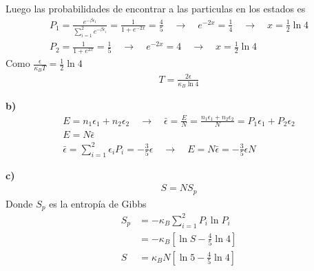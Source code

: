 \documentclass{article}
\begin{document}
Luego las probabilidades de encontrar a las particulas en los estados es 
\begin{gather*}
  P_1 = \frac{e ^ {-\beta \epsilon_1}}{\displaystyle\sum_{i= 1 }^{2 } e ^ {-\beta \epsilon_i }} = \frac{1}{1 + e ^ {- 2x }} = \frac{4}{5} \quad \rightarrow \quad e ^ {-2x } = \frac{1}{4} \quad \rightarrow \quad x = \frac{1}{2} \ln 4 
  \\
  P_2 = \frac{1}{1 + e ^ {2 x }} = \frac{1}{5 } \quad \rightarrow \quad e ^ {-2x } = 4 \quad \rightarrow \quad x = \frac{1}{2} \ln 4
\end{gather*}
Como $ \frac{\epsilon}{\kappa_B T } = \frac{1}{2}\ln 4  $ 
\begin{gather*}
  T = \frac{2\epsilon}{\kappa_B \ln 4 } 
\end{gather*}

\hfill 

\hfill 

\textbf{b) } 
\begin{gather*}
  E = n_1 \epsilon_1 + n_2 \epsilon_2 \quad \rightarrow \quad \bar \epsilon = \frac{E}{N } = \frac{n_1 \epsilon_1 + n_2 \epsilon_2 }{N } = P_1 \epsilon_1 + P_2 \epsilon_2  \\
  E = N \bar \epsilon \\
  \bar \epsilon = \displaystyle\sum_{i= 1 }^{2 } \epsilon_i P_i = - \frac{3 }{5 } \epsilon \quad \rightarrow \quad E = N \bar \epsilon = - \frac{3}{5} \epsilon N 
\end{gather*}

\hfill 

\hfill 

\textbf{c) } 
\begin{gather*}
  S = N S_p  
\end{gather*}
Donde $ S_p  $ es la entropía de Gibbs 
\begin{align*}
  S_p &= - \kappa_B \displaystyle\sum_{i = 1 }^{2 } P_i \ln P_i  
  \\
      &= - \kappa_B \left[\ln S - \frac{4}{5 } \ln 4 \right] \\
    S &= \kappa_B N \left[\ln 5 - \frac{4}{5} \ln 4\right]
\end{align*}
\end{document}
